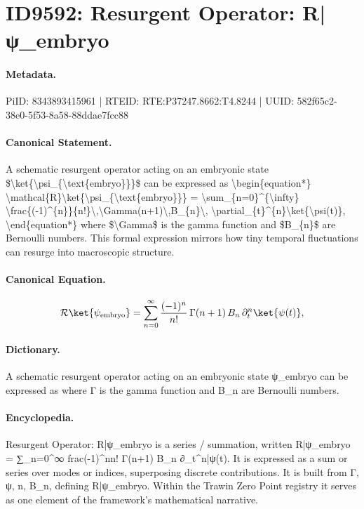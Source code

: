 \section*{ID9592: Resurgent Operator: R|ψ\_embryo}
\paragraph{Metadata.}
PiID: 8343893415961 | RTEID: RTE:P37247.8662:T4.8244 | UUID: 582f65c2-38e0-5f53-8a58-88ddae7fcc88

\paragraph{Canonical Statement.}
A schematic resurgent operator acting on an embryonic state \$\textbackslash{}ket\{\textbackslash{}psi\_\{\textbackslash{}text\{embryo\}\}\}\$ can be expressed as \textbackslash{}begin\{equation*\} \textbackslash{}mathcal\{R\}\textbackslash{}ket\{\textbackslash{}psi\_\{\textbackslash{}text\{embryo\}\}\} = \textbackslash{}sum\_\{n=0\}\textasciicircum{}\{\textbackslash{}infty\} \textbackslash{}frac\{(-1)\textasciicircum{}\{n\}\}\{n!\}\textbackslash{},\textbackslash{}Gamma(n+1)\textbackslash{},B\_\{n\}\textbackslash{}, \textbackslash{}partial\_\{t\}\textasciicircum{}\{n\}\textbackslash{}ket\{\textbackslash{}psi(t)\}, \textbackslash{}end\{equation*\} where \$\textbackslash{}Gamma\$ is the gamma function and \$B\_\{n\}\$ are Bernoulli numbers. This formal expression mirrors how tiny temporal fluctuations can resurge into macroscopic structure.

\paragraph{Canonical Equation.}
\[
\mathcal{R}\ket{\psi_{\text{embryo}}} = \sum_{n=0}^{\infty} \frac{(-1)^{n}}{n!}\,\Gamma(n+1)\,B_{n}\, \partial_{t}^{n}\ket{\psi(t)},
\]

\paragraph{Dictionary.}
A schematic resurgent operator acting on an embryonic state ψ\_embryo can be expressed as where Γ is the gamma function and B\_n are Bernoulli numbers.

\paragraph{Encyclopedia.}
Resurgent Operator: R|ψ\_embryo is a series / summation, written R|ψ\_embryo = ∑\_n=0\textasciicircum{}∞ frac(-1)\textasciicircum{}nn! Γ(n+1) B\_n ∂\_t\textasciicircum{}n|ψ(t). It is expressed as a sum or series over modes or indices, superposing discrete contributions. It is built from Γ, ψ, n, B\_n, defining R|ψ\_embryo. Within the Trawin Zero Point registry it serves as one element of the framework's mathematical narrative.
